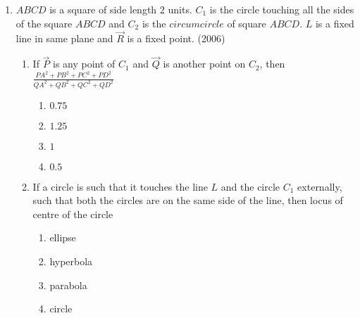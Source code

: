 \begin{enumerate}
\begin{multicols}{4}
\begin{enumerate}
                 \item $\brak{-\frac{3}{2}, 0}$
                 \item $\brak{-\frac{5}{2}, 2}$
                 \item $\brak{-\frac{3}{2}, \frac{5}{2}}$
                 \item $\brak{-4, 0}$
             \end{enumerate}
\end{multicols}
\item $ABCD$ is a square of side length $2$ units. $C_1$ is the circle touching all the sides of the square $ABCD$ and $C_2$ is the $circumcircle$ of square $ABCD$. $L$ is a fixed line in same plane and $\vec{R}$ is a fixed point.
\hfill(2006)
\begin{enumerate}
\item If $\vec{P}$ is any point of $C_1$ and $\vec{Q}$ is another point on $C_2$, then $\frac{PA^2+PB^2+PC^2+PD^2}{QA^2+QB^2+QC^2+QD^2}$
%
\begin{multicols}{4}
\begin{enumerate}
\item $0.75$
\item $1.25$
\item $1$
\item $0.5$
\end{enumerate}
\end{multicols}
\item If a circle is such that it touches the line $L$ and the circle $C_1$ externally, such that both the circles are on the same side of the line, then locus of centre of the circle 
%
\begin{multicols}{4}
\begin{enumerate}
\item ellipse
\item hyperbola
\item parabola
\item circle
\end{enumerate}
\end{multicols}


\end{enumerate}
\end{enumerate}
